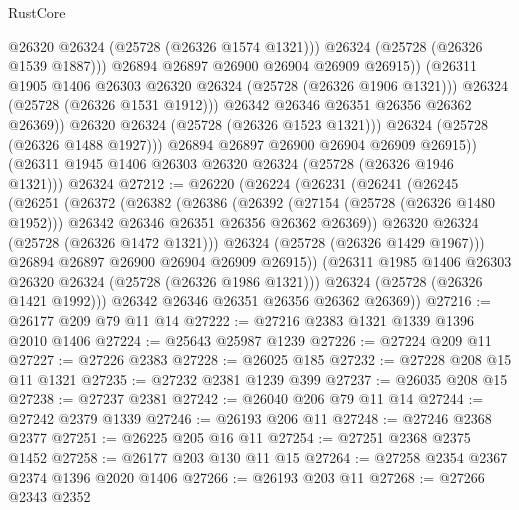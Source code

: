 \begin{lexlean}{RustCore}
\begin{coremodule}
                          @26320
                          @26324
                          (@25728 (@26326 @1574 @1321)))
                        @26324
                        (@25728 (@26326 @1539 @1887)))
                      @26894
                      @26897
                      @26900
                      @26904
                      @26909
                      @26915))
                  (@26311 @1905 @1406 @26303 @26320 @26324 (@25728 (@26326 @1906 @1321)))
                  @26324
                  (@25728 (@26326 @1531 @1912)))
                @26342
                @26346
                @26351
                @26356
                @26362
                @26369))
            @26320
            @26324
            (@25728 (@26326 @1523 @1321)))
          @26324
          (@25728 (@26326 @1488 @1927)))
        @26894
        @26897
        @26900
        @26904
        @26909
        @26915))
    (@26311 @1945 @1406 @26303 @26320 @26324 (@25728 (@26326 @1946 @1321)))
    @26324
@27212 := @26220
    (@26224
      (@26231
        (@26241
          (@26245
            (@26251
              (@26372
                (@26382
                  (@26386
                    (@26392
                      (@27154 (@25728 (@26326 @1480 @1952)))
                      @26342
                      @26346
                      @26351
                      @26356
                      @26362
                      @26369))
                  @26320
                  @26324
                  (@25728 (@26326 @1472 @1321)))
                @26324
                (@25728 (@26326 @1429 @1967)))
              @26894
              @26897
              @26900
              @26904
              @26909
              @26915))
          (@26311 @1985 @1406 @26303 @26320 @26324 (@25728 (@26326 @1986 @1321)))
          @26324
          (@25728 (@26326 @1421 @1992)))
        @26342
        @26346
        @26351
        @26356
        @26362
        @26369))
@27216 := @26177 @209 @79 @11 @14
@27222 := @27216 @2383 @1321 @1339 @1396 @2010 @1406
@27224 := @25643 @25987 @1239
@27226 := @27224 @209 @11
@27227 := @27226 @2383
@27228 := @26025 @185
@27232 := @27228 @208 @15 @11 @1321
@27235 := @27232 @2381 @1239 @399
@27237 := @26035 @208 @15
@27238 := @27237 @2381
@27242 := @26040 @206 @79 @11 @14
@27244 := @27242 @2379 @1339
@27246 := @26193 @206 @11
@27248 := @27246 @2368 @2377
@27251 := @26225 @205 @16 @11
@27254 := @27251 @2368 @2375 @1452
@27258 := @26177 @203 @130 @11 @15
@27264 := @27258 @2354 @2367 @2374 @1396 @2020 @1406
@27266 := @26193 @203 @11
@27268 := @27266 @2343 @2352

\end{coremodule}
\end{lexlean}
